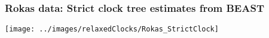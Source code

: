 \begin{frame}
\frametitle{Rokas data: Strict clock tree estimates from BEAST}

\begin{centering}

\texttt{[image: ../images/relaxedClocks/Rokas\_StrictClock]}

\end{centering}

\end{frame}